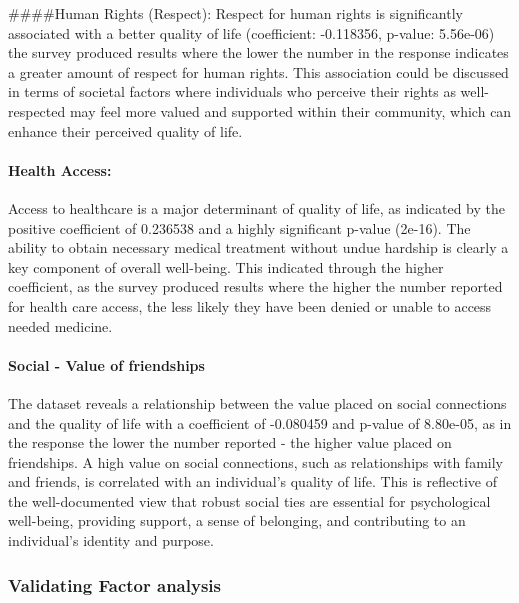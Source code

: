 \documentclass[
]{article}
\begin{document}
\#\#\#\#Human Rights (Respect): Respect for human rights is
significantly associated with a better quality of life (coefficient:
-0.118356, p-value: 5.56e-06) the survey produced results where the
lower the number in the response indicates a greater amount of respect
for human rights. This association could be discussed in terms of
societal factors where individuals who perceive their rights as
well-respected may feel more valued and supported within their
community, which can enhance their perceived quality of life.

\hypertarget{health-access}{%
\paragraph{Health Access:}\label{health-access}}

Access to healthcare is a major determinant of quality of life, as
indicated by the positive coefficient of 0.236538 and a highly
significant p-value (2e-16). The ability to obtain necessary medical
treatment without undue hardship is clearly a key component of overall
well-being. This indicated through the higher coefficient, as the survey
produced results where the higher the number reported for health care
access, the less likely they have been denied or unable to access needed
medicine.

\hypertarget{social---value-of-friendships}{%
\paragraph{Social - Value of
friendships}\label{social---value-of-friendships}}

The dataset reveals a relationship between the value placed on social
connections and the quality of life with a coefficient of -0.080459 and
p-value of 8.80e-05, as in the response the lower the number reported -
the higher value placed on friendships. A high value on social
connections, such as relationships with family and friends, is
correlated with an individual's quality of life. This is reflective of
the well-documented view that robust social ties are essential for
psychological well-being, providing support, a sense of belonging, and
contributing to an individual's identity and purpose.

\hypertarget{validating-factor-analysis}{%
\subsubsection{Validating Factor
analysis}\label{validating-factor-analysis}}
\end{document}
